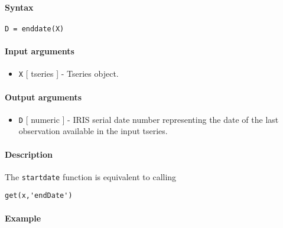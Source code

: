 


	\paragraph{Syntax}\label{syntax}

\begin{verbatim}
D = enddate(X)
\end{verbatim}

\paragraph{Input arguments}\label{input-arguments}

\begin{itemize}
\itemsep1pt\parskip0pt
\item
  \texttt{X} {[} tseries {]} - Tseries object.
\end{itemize}

\paragraph{Output arguments}\label{output-arguments}

\begin{itemize}
\itemsep1pt\parskip0pt
\item
  \texttt{D} {[} numeric {]} - IRIS serial date number representing the
  date of the last observation available in the input tseries.
\end{itemize}

\paragraph{Description}\label{description}

The \texttt{startdate} function is equivalent to calling

\begin{verbatim}
get(x,'endDate')
\end{verbatim}

\paragraph{Example}\label{example}


